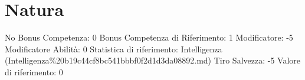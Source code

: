 \section{Natura}\label{natura}

\begin{description}
\tightlist
\item[Tags: ABI]
No Bonus Competenza: 0 Bonus Competenza di Riferimento: 1 Modificatore:
-5 Modificatore Abilità: 0 Statistica di riferimento: Intelligenza
(Intelligenza\%20b19c44cf8bc541bbbf0f2d1d3da08892.md) Tiro Salvezza: -5
Valore di riferimento: 0
\end{description}
